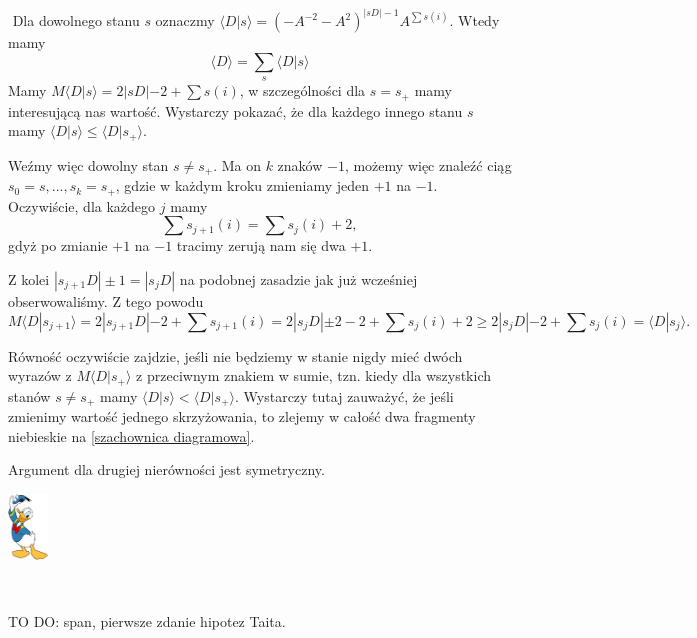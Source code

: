 \documentclass{article}
\renewenvironment{proof}{{\bfseries\color{orange} Dowód}$ $\newline}{
  \begin{flushright}\includegraphics[width=30pt]{Donald_Duck.png}\end{flushright}$ $\newline
}
\begin{document}
\begin{proof}
  Dla dowolnego stanu $s$ oznaczmy $\langle D|s\rangle=(-A^{-2}-A^2)^{|sD|-1}A^{\sum s(i)}$. Wtedy mamy 
  $$\langle D\rangle = \sum_s \langle D|s\rangle$$
  Mamy $M\langle D|s\rangle=2|sD|-2+\sum s(i)$, w szczególności dla $s=s_+$ mamy interesującą nas wartość. Wystarczy pokazać, że dla każdego innego stanu $s$ mamy $\langle D|s\rangle \leq \langle D|s_+\rangle$.

  Weźmy więc dowolny stan $s\neq s_+$. Ma on $k$ znaków $-1$, możemy więc znaleźć ciąg $s_0=s,...,s_k=s_+$, gdzie w każdym kroku zmieniamy jeden $+1$ na $-1$. Oczywiście, dla każdego $j$ mamy 
  $$\sum s_{j+1}(i)=\sum s_j(i)+2,$$
  gdyż po zmianie $+1$ na $-1$ tracimy zerują nam się dwa $+1$.

  Z kolei $|s_{j+1}D|\pm 1=|s_jD|$ na podobnej zasadzie jak już wcześniej obserwowaliśmy. Z tego powodu 
  $$M\langle D|s_{j+1}\rangle =2|s_{j+1}D|-2+\sum s_{j+1}(i)=2|s_jD|\pm 2-2+\sum s_j(i)+2\geq 2|s_jD|-2+\sum s_j(i)=\langle D|s_j\rangle.$$

  Równość oczywiście zajdzie, jeśli nie będziemy w stanie nigdy mieć dwóch wyrazów z $M\langle D|s_+\rangle$ z przeciwnym znakiem w sumie, tzn. kiedy dla wszystkich stanów $s\neq s_+$ mamy $\langle D|s\rangle < \langle D|s_+\rangle$. Wystarczy tutaj zauważyć, że jeśli zmienimy wartość jednego skrzyżowania, to zlejemy w całość dwa fragmenty niebieskie na \cref{szachownica diagramowa}.

  Argument dla drugiej nierówności jest symetryczny.
\end{proof}

TO DO: span, pierwsze zdanie hipotez Taita.
\end{document}
